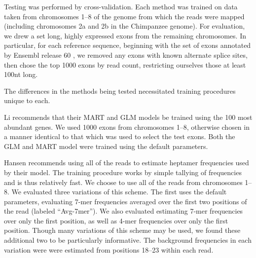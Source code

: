 \documentclass{bioinfo}
\begin{document}
\begin{comment}
\begin{tablehere}
\begin{center}
\footnotesize{
\begin{tabular}{lllr}
\textbf{Experiment} & \textbf{Species} & \textbf{Platform} & \textbf{Read Length} \\ \hline
Wetterbom \cite{Wetterbom2010} & Chimpanzee & ABI & 33 \\
Katze (unpublished) & Macaque & ABI & 50 \\
Bullard \cite{Bullard2010} & Human & Illumina & 35 \\
Mortazavi \cite{Mortazavi2008} & Mouse & Illumina & 33 \\
Trapnell \cite{Trapnell2010} & Mouse & Illumina & 75
\end{tabular}
}
\end{center}
\caption{Data sets on which the methods are evaluated.}
\label{tab:datasets}
\end{tablehere}
\end{comment}


Testing was performed by cross-validation. Each method was trained on data taken
from chromosomes 1--8 of the genome from which the reads were mapped (including
chromosomes 2a and 2b in the Chimpanzee genome). For evaluation, we drew a set
long, highly expressed exons from the remaining chromosomes. In particular, for
each reference sequence, beginning with the set of exons annotated by Ensembl
release 60 \cite{Hubbard2009}, we removed any exons with known alternate splice
sites, then chose the top 1000 exons by read count, restricting ourselves those
at least 100nt long.

The differences in the methods being tested necessitated training procedures
unique to each.

Li recommends that their MART and GLM models be trained using the 100 most abundant
genes. We used 1000 exons from chromosomes 1--8, otherwise chosen in a manner
identical to that which was used to select the test exons.  Both the GLM and
MART model were trained using the default parameters.

Hansen recommends using all of the reads to estimate heptamer frequencies used by
their model. The training procedure works by simple tallying of frequencies and
is thus relatively fast. We choose to use all of the reads from chromosomes 1--8.
We evaluated three variations of this scheme. The first uses the default
parameters, evaluating 7-mer frequencies averaged over the first two positions
of the read (labeled ``Avg-7mer''). We also evaluated estimating 7-mer
frequencies over only the first position, as well as 4-mer frequencies over only
the first position. Though many variations of this scheme may be used, we found these
additional two to be particularly informative. The background frequencies in
each variation were were estimated from positions 18--23 within each read.
\end{document}

